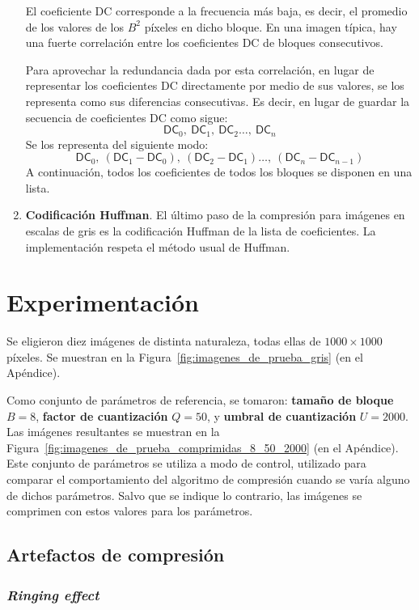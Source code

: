 \documentclass{article}
\begin{document}
\begin{enumerate}
  El coeficiente DC corresponde a la frecuencia más baja, es
  decir, el promedio de los valores de los $B^2$ píxeles en
  dicho bloque.
  En una imagen típica, hay una fuerte correlación entre los
  coeficientes DC de bloques consecutivos.

  Para aprovechar la redundancia dada por esta correlación,
  en lugar de representar los coeficientes DC directamente por
  medio de sus valores,
  se los representa como sus diferencias consecutivas.
  Es decir, en lugar de guardar la secuencia de coeficientes
  DC como sigue:
  \[
    \mathsf{DC}_0,\ \mathsf{DC}_1,\ \mathsf{DC}_2 \hdots,\ \mathsf{DC}_n
  \]
  Se los representa del siguiente modo:
  \[
    \mathsf{DC}_0,\ (\mathsf{DC}_1 - \mathsf{DC}_0),\ (\mathsf{DC}_2 - \mathsf{DC}_1) \hdots,\ (\mathsf{DC}_n - \mathsf{DC}_{n-1})
  \]
  A continuación, todos los coeficientes de todos los bloques
  se disponen en una lista.
\item
  {\bf Codificación Huffman}.
  El último paso de la compresión para imágenes en escalas de
  gris es la codificación Huffman de la lista de coeficientes.
  La implementación respeta el método usual de Huffman.
\end{enumerate}

\section{Experimentación}

Se eligieron diez imágenes de distinta naturaleza, todas ellas de
$1000 \times 1000$ píxeles. Se muestran en la Figura~\ref{fig:imagenes_de_prueba_gris} (en el Apéndice).

Como conjunto de parámetros de referencia, se tomaron:
{\bf tamaño de bloque} $B = 8$,
{\bf factor de cuantización} $Q = 50$,
y {\bf umbral de cuantización} $U = 2000$.
Las imágenes resultantes se muestran en
la Figura~\ref{fig:imagenes_de_prueba_comprimidas_8_50_2000}
(en el Apéndice).
Este conjunto de parámetros se utiliza a modo de control,
utilizado para comparar el comportamiento del algoritmo de compresión
cuando se varía alguno de dichos parámetros.
Salvo que se indique lo contrario, las imágenes se comprimen con
estos valores para los parámetros.

\subsection{Artefactos de compresión}

\subsubsection{{\em Ringing effect}}
\end{document}
